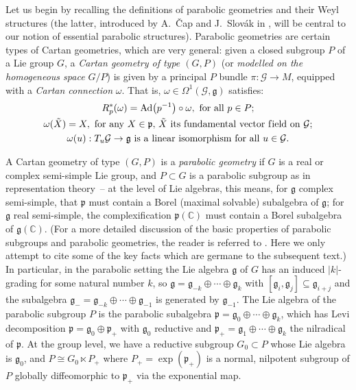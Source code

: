 \documentclass[11pt]{article}
\def\C{\mathbb{C}}
\def\g{\mathfrak{g}}
\def\p{\mathfrak{p}}
\def\Gbdle{\mathcal{G}}
\def\dsum{\oplus}
\def\isom{\cong}
\theoremstyle{plain}
\theoremstyle{definition}
\begin{document}
Let us begin by recalling the def\/initions of parabolic geometries and their Weyl structures (the latter, introduced by A.~\v{C}ap and J.~Slov\'ak in \cite{CS03}, will be central to our notion of essential parabolic structures). Parabolic geometries are certain types of Cartan geometries, which are very general: given a closed subgroup $P$ of a Lie group $G$, a \textit{Cartan geometry of type $(G,P)$} (or \textit{modelled on the homogeneous space $G/P$}) is given by a principal $P$ bundle $\pi: \Gbdle \rightarrow M$, equipped with a \textit{Cartan connection} $\omega$. That is, $\omega \in \Omega^1(\Gbdle,\g)$ satisf\/ies:
\begin{gather}
R_p^*(\omega) = \mathrm{Ad}\big(p^{-1}\big) \circ \omega, \,\, \mathrm{for} \,\, \mathrm{all} \,\, p \in P; \label{ad-inv}\\
\omega(\tilde{X}) = X, \,\, \mathrm{for} \,\, \mathrm{any} \,\, X \in \p, \, \tilde{X} \,\, \mathrm{its} \,\, \mathrm{fundamental} \,\, \mathrm{vector} \,\, \mathrm{f\/ield} \,\, \mathrm{on} \,\, \Gbdle; \label{fund-vfs}\\
\omega(u) : T_u\Gbdle \rightarrow \g \,\, \mathrm{is} \,\, \mathrm{a} \,\, \mathrm{linear} \,\, \mathrm{isomorphism} \,\, \mathrm{for} \,\, \mathrm{all} \,\,u \in \Gbdle. \label{parallelism}
\end{gather}

A Cartan geometry of type $(G,P)$ is a \emph{parabolic geometry} if $G$ is a real or complex semi-simple Lie group, and $P \subset G$ is a parabolic subgroup as in representation theory~-- at the level of Lie algebras, this means, for $\g$ complex semi-simple, that $\p$ must contain a Borel (maximal solvable) subalgebra of $\g$; for $\g$ real semi-simple, the complexif\/ication $\p(\C)$ must contain a Borel subalgebra of $\g(\C)$. (For a more detailed discussion of the basic properties of parabolic subgroups and parabolic geometries, the reader is referred to \cite{CSbook}. Here we only attempt to cite some of the key facts which are germane to the subsequent text.) In particular, in the parabolic setting the Lie algebra $\g$ of $G$ has an induced $\vert k \vert$-grading for some natural number $k$, so $\g = \g_{-k} \dsum \cdots \dsum \g_k$ with $[\g_i,\g_j] \subseteq \g_{i+j}$ and the subalgebra $\g_- = \g_{-k} \dsum \cdots \dsum \g_{-1}$ is generated by $\g_{-1}$. The Lie algebra of the parabolic subgroup $P$ is the parabolic subalgebra $\p = \g_0 \dsum \cdots \dsum \g_{k}$, which has Levi decomposition $\p = \g_0 \dsum \p_+$ with $\g_0$ reductive and $\p_+ = \g_1 \dsum \cdots \dsum \g_k$ the nilradical of $\p$. At the group level, we have a reductive subgroup $G_0 \subset P$ whose Lie algebra is $\g_0$, and $P \isom G_0 \ltimes P_+$ where $P_+ = \exp (\p_+)$ is a normal, nilpotent subgroup of $P$ globally dif\/feomorphic to $\p_+$ via the exponential map.
\end{document}
